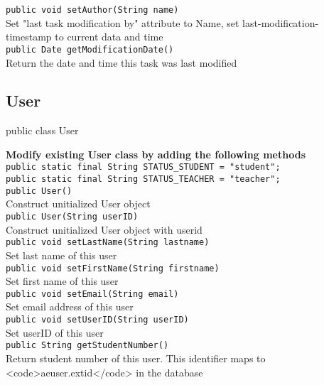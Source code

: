 {\tt 		public void setAuthor(String name)} \\
Set "last task modification by" attribute to Name, set last-modification-timestamp to current data and time\\

{\tt 		public Date getModificationDate()} \\
Return the date and time this task was last modified\\





\subsection{User}
public class User 

{\bf Modify existing User class by adding the following methods}\\

{\tt		public static final String STATUS\_STUDENT = "student";} \\ 
{\tt		public static final String STATUS\_TEACHER = "teacher";} \\ 
	
{\tt		public User()} \\ 
Construct unitialized User object\\
	
{\tt		public User(String userID)} \\ 
Construct unitialized User object with userid\\
	
{\tt		public void setLastName(String lastname)} \\ 
Set last name of this user\\
	
{\tt		public void setFirstName(String firstname)} \\ 
Set first name of this user\\
	
{\tt		public void setEmail(String email)} \\ 
Set email address of this user\\

{\tt		public void setUserID(String userID)} \\ 
Set userID of this user\\

{\tt		public String getStudentNumber()} \\ 
Return student number of this user. This identifier maps to <code>aeuser.extid</code> in the database\\
	
